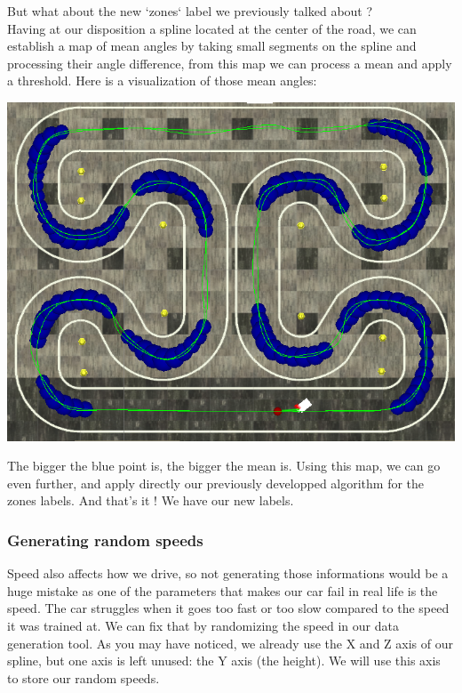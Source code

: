 \documentclass[12pt]{article}
\begin{document}
But what about the new `zones` label we previously talked about ? \\

Having at our disposition a spline located at the center of the road, we can establish a map of mean angles by taking small segments on the spline and processing their angle difference, from this map we can process a mean and apply a threshold.
Here is a visualization of those mean angles: \\
\centerline{\includegraphics[width=15cm]{../../docs/sim-zones.png}} 

The bigger the blue point is, the bigger the mean is. Using this map, we can go even further, and apply directly our previously developped algorithm for the zones labels. And that's it ! We have our new labels.

\subsubsection{Generating random speeds}
Speed also affects how we drive, so not generating those informations would be a huge mistake as one of the parameters that makes our car fail in real life is the speed. The car struggles when it goes too fast or too slow compared to the speed it was trained at. We can fix that by randomizing the speed in our data generation tool. As you may have noticed, we already use the X and Z axis of our spline, but one axis is left unused: the Y axis (the height). We will use this axis to store our random speeds.
\end{document}
